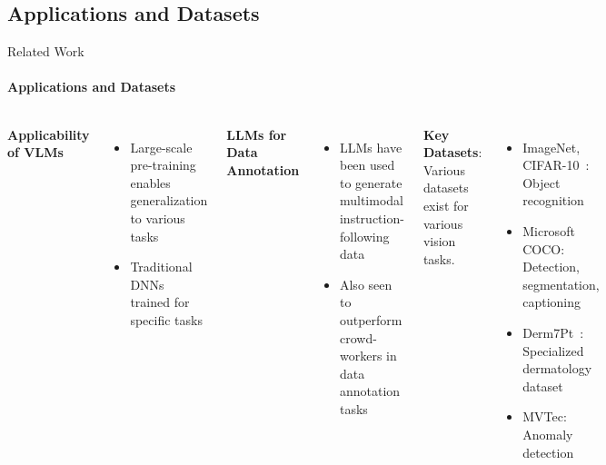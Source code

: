 \documentclass[aspectratio=169]{beamer}
\begin{document}
\subsection{Applications and Datasets}
\begin{frame}{Related Work}
\framesubtitle{Applications and Datasets}
  \begin{columns}[T]
      \textbf{Applicability of VLMs}
      \begin{itemize}
        \item Large-scale pre-training enables generalization to various tasks
        \item Traditional DNNs trained for specific tasks
      \end{itemize}
      \vspace{0.5em}
      \textbf{LLMs for Data Annotation}
      \begin{itemize}
        \item LLMs have been used to generate multimodal instruction-following data~
        \item Also seen to outperform crowd-workers in data annotation tasks~
      \end{itemize}
      \textbf{Key Datasets}:
      Various datasets exist for various vision tasks.
      \begin{itemize}
        \item ImageNet, CIFAR-10~: Object recognition
        \item Microsoft COCO: Detection, segmentation, captioning
        \item Derm7Pt~: Specialized dermatology dataset
        \item MVTec: Anomaly detection
      \end{itemize}
  \end{columns}
\end{frame}
\end{document}
